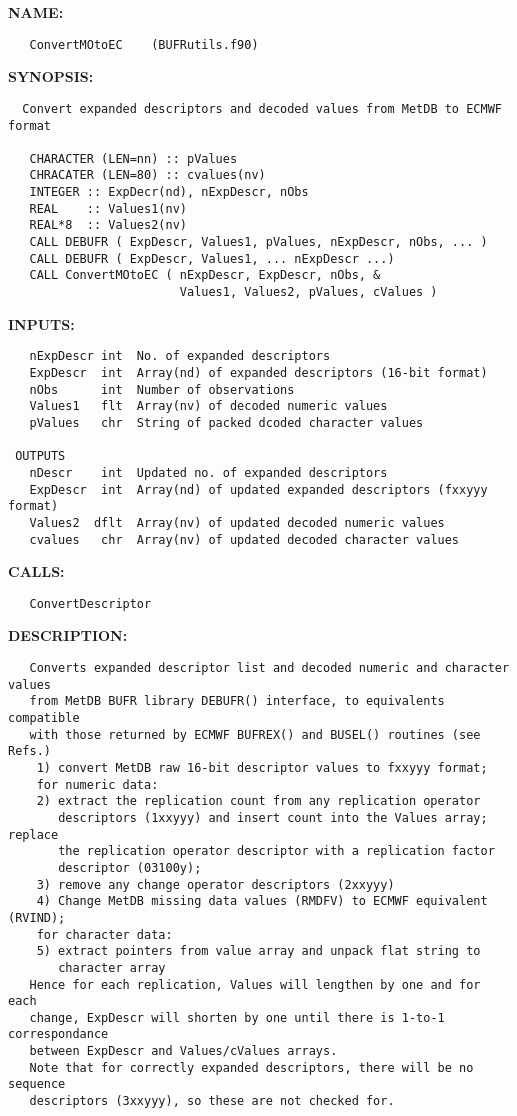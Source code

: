 \label{ch:robo5}
\label{ch:BUFR_BUFRUTILS_ConvertMOtoEC}
\textbf{NAME:}\hspace{0.08in}\begin{Verbatim}
   ConvertMOtoEC    (BUFRutils.f90)
\end{Verbatim}
\textbf{SYNOPSIS:}\hspace{0.08in}\begin{Verbatim}
  Convert expanded descriptors and decoded values from MetDB to ECMWF format

   CHARACTER (LEN=nn) :: pValues
   CHRACATER (LEN=80) :: cvalues(nv)
   INTEGER :: ExpDecr(nd), nExpDescr, nObs
   REAL    :: Values1(nv)
   REAL*8  :: Values2(nv)
   CALL DEBUFR ( ExpDescr, Values1, pValues, nExpDescr, nObs, ... )
   CALL DEBUFR ( ExpDescr, Values1, ... nExpDescr ...)
   CALL ConvertMOtoEC ( nExpDescr, ExpDescr, nObs, &
                        Values1, Values2, pValues, cValues )
\end{Verbatim}
\textbf{INPUTS:}\hspace{0.08in}\begin{Verbatim}
   nExpDescr int  No. of expanded descriptors
   ExpDescr  int  Array(nd) of expanded descriptors (16-bit format)
   nObs      int  Number of observations
   Values1   flt  Array(nv) of decoded numeric values
   pValues   chr  String of packed dcoded character values

 OUTPUTS
   nDescr    int  Updated no. of expanded descriptors
   ExpDescr  int  Array(nd) of updated expanded descriptors (fxxyyy format)
   Values2  dflt  Array(nv) of updated decoded numeric values
   cvalues   chr  Array(nv) of updated decoded character values
\end{Verbatim}
\textbf{CALLS:}\hspace{0.08in}\begin{Verbatim}
   ConvertDescriptor
\end{Verbatim}
\textbf{DESCRIPTION:}\hspace{0.08in}\begin{Verbatim}
   Converts expanded descriptor list and decoded numeric and character values
   from MetDB BUFR library DEBUFR() interface, to equivalents compatible
   with those returned by ECMWF BUFREX() and BUSEL() routines (see Refs.)
    1) convert MetDB raw 16-bit descriptor values to fxxyyy format;
    for numeric data:
    2) extract the replication count from any replication operator
       descriptors (1xxyyy) and insert count into the Values array; replace
       the replication operator descriptor with a replication factor
       descriptor (03100y);
    3) remove any change operator descriptors (2xxyyy)
    4) Change MetDB missing data values (RMDFV) to ECMWF equivalent (RVIND);
    for character data:
    5) extract pointers from value array and unpack flat string to
       character array
   Hence for each replication, Values will lengthen by one and for each
   change, ExpDescr will shorten by one until there is 1-to-1 correspondance
   between ExpDescr and Values/cValues arrays.
   Note that for correctly expanded descriptors, there will be no sequence
   descriptors (3xxyyy), so these are not checked for.
\end{Verbatim}
